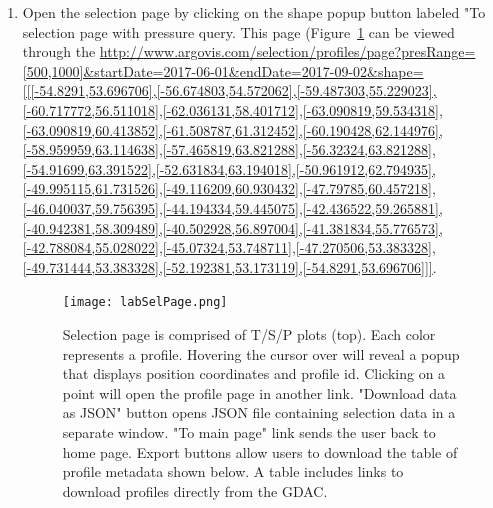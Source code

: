 \begin{enumerate}
\item Open the selection page by clicking on the shape popup button labeled "To selection page with pressure query. This page (Figure~\ref{fig:lab_sel_page} can be viewed through the \url{http://www.argovis.com/selection/profiles/page?presRange=[500,1000]&startDate=2017-06-01&endDate=2017-09-02&shape=[[[-54.8291,53.696706],[-56.674803,54.572062],[-59.487303,55.229023],[-60.717772,56.511018],[-62.036131,58.401712],[-63.090819,59.534318],[-63.090819,60.413852],[-61.508787,61.312452],[-60.190428,62.144976],[-58.959959,63.114638],[-57.465819,63.821288],[-56.32324,63.821288],[-54.91699,63.391522],[-52.631834,63.194018],[-50.961912,62.794935],[-49.995115,61.731526],[-49.116209,60.930432],[-47.79785,60.457218],[-46.040037,59.756395],[-44.194334,59.445075],[-42.436522,59.265881],[-40.942381,58.309489],[-40.502928,56.897004],[-41.381834,55.776573],[-42.788084,55.028022],[-45.07324,53.748711],[-47.270506,53.383328],[-49.731444,53.383328],[-52.192381,53.173119],[-54.8291,53.696706]]]}.


\begin{figure}[H]
\begin{minipage}{6in}
\centering
\texttt{[image: labSelPage.png]}
\caption{\label{fig:lab_sel_page} Selection page is comprised of T/S/P plots (top). Each color represents a profile. Hovering the cursor over will reveal a popup that displays position coordinates and profile id. Clicking on a point will open the profile page in another link. "Download data as JSON" button opens JSON file containing selection data in a separate window. "To main page" link sends the user back to home page. Export buttons allow users to download the table of profile metadata shown below. A table includes links to download profiles directly from the GDAC.}
\end{minipage}
\end{figure}


\end{enumerate}
